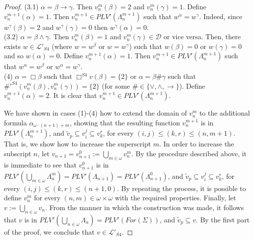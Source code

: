 \documentclass[12pt]{article}
\begin{document}
\begin{proof}
(3.1) $\alpha=\beta\to\gamma$. Then $v_n^{m}(\beta)=2$ and $v_n^{m}(\gamma)=1$. Define $v_n^{m+1}(\alpha)=1$. Then  $v_n^{m+1} \in PLV'(\Lambda_n^{m+1})$ such that $w^\alpha=w^\gamma$. Indeed, since $w^\gamma(\beta)=2$ and $w^\gamma(\gamma)=0$ then $w^\gamma(\alpha)=0$. \\[1mm]
(3.2) $\alpha=\beta\land\gamma$. Then $v_n^{m}(\beta)=1$ and $v_n^{m}(\gamma) \in \mathcal{D}$ or vice versa. Then, there exists $w \in  \mathcal{L}'_{S4}$ (where $w=w^\beta$ or  $w=w^\gamma$)  such that $w(\beta)=0$ or $w(\gamma)=0$ and so $w(\alpha)=0$. Define $v_n^{m+1}(\alpha)=1$. Then  $v_n^{m+1} \in PLV'(\Lambda_n^{m+1})$ such that $w^\alpha=w^\beta$ or $w^\alpha=w^\gamma$. \\[1mm]
(4) $\alpha=\Box\beta$ such that $\Box^{S4} v(\beta) =\{2\}$ or $\alpha=\beta\#\gamma$ such that $\#'^{S4} (v_n^{m}(\beta),v_n^{m}(\gamma))  =\{2\}$ (for some $\# \in \{\vee,\land, \to\}$). Define $v_n^{m+1}(\alpha)=2$. It is clear that $v_n^{m+1} \in PLV'(\Lambda_n^{m+1})$.

We have shown in cases (1)-(4) how to extend the domain of $v_n^{m}$ to the additional formula $\alpha_{\omega\cdot (n+1) +m}$, showing that the resulting function $v_n^{m+1}$ is in $PLV'(\Lambda_n^{m+1})$, and $\tilde v_p \subseteq v_i^j \subseteq v_k^r$, for every  $(i,j) \leq (k,r) \leq (n,m+1)$. That is, we show how to increase the superscript $m$. In order to increase the subscript $n$, let $v_{n+1}=v_{n+1}^0 := \bigcup_{m \in \omega} v_n^m$. By the procedure described above, it is immediate to see that $v_{n+1}^0$ is in $PLV'(\bigcup_{m \in \omega} {\Lambda}_n^m) = PLV'({\Lambda}_{n+1})= PLV'({\Lambda}_{n+1}^0)$, and $\tilde v_p \subseteq v_i^j \subseteq v_k^r$, for every  $(i,j) \leq (k,r) \leq (n+1,0)$. By repeating the process, it is possible to define $v_n^m$ for every $(n,m) \in \omega\times \omega$ with the required properties. Finally, let $v:=\bigcup_{n\in \omega} v_n$. From the manner in which the construction was made, it follows that  $v$ is in $PLV'(\bigcup_{n \in \omega}{\Lambda}_{n})= PLV'(For(\Sigma))$, and $\tilde v_p \subseteq v$. By the first part of the proof, we conclude that $v \in  \mathcal{L}'_{S4}$.
\end{proof}
\end{document}
